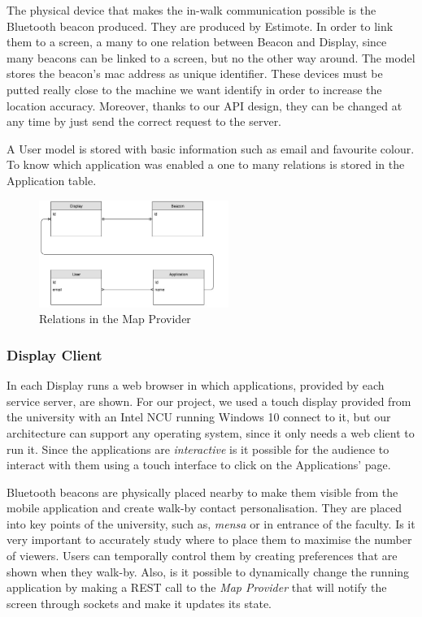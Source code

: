 \documentclass[]{usiinfbachelorproject}
\begin{document}
The physical device that makes the in-walk communication possible is the Bluetooth beacon produced. They are produced by Estimote. In order to link them to a screen, a many to one relation between Beacon and Display, since many beacons can be linked to a screen, but no the other way around. The model stores the beacon's mac address as unique identifier. These devices must be putted really close to the machine we want identify in order to increase the location accuracy. Moreover, thanks to our API design, they can be changed at any time by just send the correct request to the server.

A User model is stored with basic information such as email and favourite colour. To know which application was enabled a one to many relations is stored in the Application table. 
\begin{figure}[H]
  \centering
  \includegraphics[width=0.55\textwidth]{./images/TacitaRelations.jpg}
   \caption{Relations in the Map Provider}

\end{figure} 

\subsubsection{Display Client}
In each Display runs a web browser in which applications, provided by each service server, are shown. For our project, we used a touch display provided from the university with an Intel NCU running Windows 10 connect to it, but our architecture can support any operating system, since it only needs a web client to run it. Since the applications are \emph{interactive} is it possible for the audience to interact with them using a touch interface to click on the Applications' page.

Bluetooth beacons are physically placed nearby to make them visible from the mobile application and create walk-by contact personalisation. They are placed into key points of the university, such as, \emph{mensa} or in entrance of the faculty. Is it very important to accurately study where to place them to maximise the number of viewers. Users can temporally control them by creating preferences that are shown when they walk-by. Also, is it possible to dynamically change the running application by making a REST call to the \emph{Map Provider} that will notify the screen through sockets and make it updates its state.
\end{document}
